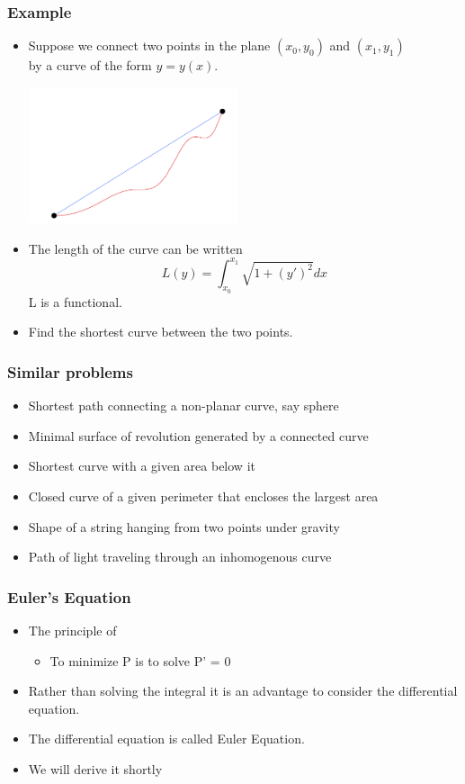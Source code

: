 \documentclass[10pt]{beamer}
\begin{document}
\begin{frame}
  \frametitle{Example}
  \begin{itemize}
  \item Suppose we connect two points in the plane $(x_0, y_0)$ and
    $(x_1, y_1)$ \\by a curve of the form $y = y(x)$.

    \centerline{\includegraphics[height=4cm]{basic-curve}}

  \item The length of the curve can be written
    \[ L(y) = \int_{x_0}^{x_1} \sqrt{1 + {(y')}^2} dx \]
    L is a functional. 
  \item Find the shortest curve between the two points. 
  \end{itemize}
\end{frame}

\begin{frame}
  \frametitle{Similar problems}
  \begin{itemize}
  \item Shortest path connecting a non-planar curve, say sphere
  \item Minimal surface of revolution generated by a connected curve
  \item Shortest curve with a given area below it
  \item Closed curve of a given perimeter that encloses the largest area
  \item Shape of a string hanging from two points under gravity
  \item Path of light traveling through an inhomogenous curve
  \end{itemize}
\end{frame}


\begin{frame}
  \frametitle{Euler's Equation}
  \begin{itemize}
  \item The principle of 
    \begin{itemize}
    \item To minimize P is to solve P' = 0
    \end{itemize}
  \item Rather than solving the integral it is an advantage to
    consider the differential equation. 
  \item The differential equation is called Euler Equation. 
  \item We will derive it shortly
  \end{itemize}
\end{frame}
\end{document}
